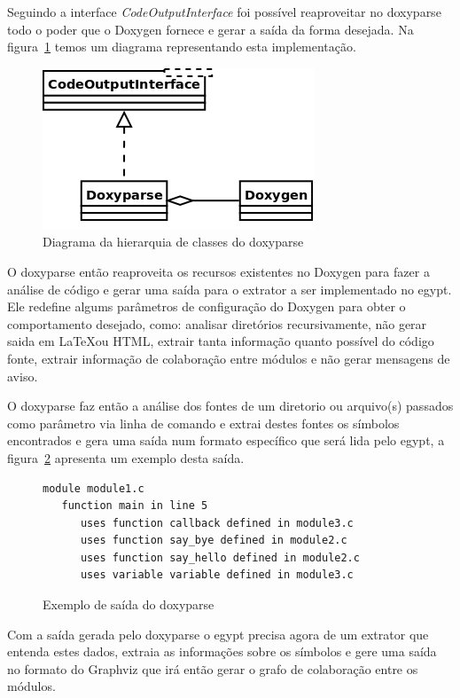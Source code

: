 Seguindo a interface {\it CodeOutputInterface} foi possível reaproveitar no
doxyparse todo o poder que o Doxygen fornece e gerar a saída da forma desejada.
Na figura~\ref{doxyparse-diagram} temos um diagrama representando esta
implementação.

\begin{figure}[h]
\center
\includegraphics[scale=0.4]{imagens/doxyparse-diagram}
\caption{Diagrama da hierarquia de classes do doxyparse}
\label{doxyparse-diagram}
\end{figure}

O doxyparse então reaproveita os recursos existentes no Doxygen para fazer a
análise de código e gerar uma saída para o extrator a ser implementado no
egypt. Ele redefine algums parâmetros de configuração do Doxygen para obter o
comportamento desejado, como: analisar diretórios recursivamente, não gerar
saida em \LaTeX ou HTML, extrair tanta informação quanto possível do código
fonte, extrair informação de colaboração entre módulos e não gerar mensagens de
aviso.

O doxyparse faz então a análise dos fontes de um diretorio ou arquivo(s)
passados como parâmetro via linha de comando e extrai destes fontes os símbolos
encontrados e gera uma saída num formato específico que será lida pelo egypt, a
figura~\ref{exemplo-saida-doxyparse} apresenta um exemplo desta saída.

\begin{figure}[h]
\begin{Verbatim}[frame=single,fontsize=\relsize{-2},fontfamily=courier]
module module1.c
   function main in line 5
      uses function callback defined in module3.c
      uses function say_bye defined in module2.c
      uses function say_hello defined in module2.c
      uses variable variable defined in module3.c
\end{Verbatim}
\caption{Exemplo de saída do doxyparse}
\label{exemplo-saida-doxyparse}
\end{figure}

Com a saída gerada pelo doxyparse o egypt precisa agora de um extrator que
entenda estes dados, extraia as informações sobre os símbolos e gere uma saída no
formato do Graphviz que irá então gerar o grafo de colaboração entre os módulos.

